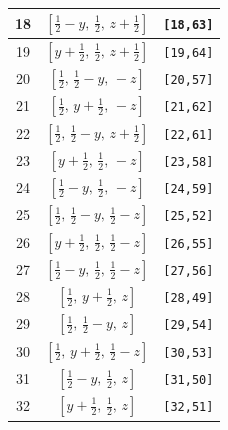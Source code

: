\documentclass[fleqn,8pt]{jsarticle}
\begin{document}
\begin{longtable}{ccc}
18 & $\left[ \frac{1}{2} - y,\, \frac{1}{2},\, z + \frac{1}{2} \right]$ & {\tt [18,63]} \\ \hline
19 & $\left[ y + \frac{1}{2},\, \frac{1}{2},\, z + \frac{1}{2} \right]$ & {\tt [19,64]} \\ \hline
20 & $\left[ \frac{1}{2},\, \frac{1}{2} - y,\, - z \right]$ & {\tt [20,57]} \\ \hline
21 & $\left[ \frac{1}{2},\, y + \frac{1}{2},\, - z \right]$ & {\tt [21,62]} \\ \hline
22 & $\left[ \frac{1}{2},\, \frac{1}{2} - y,\, z + \frac{1}{2} \right]$ & {\tt [22,61]} \\ \hline
23 & $\left[ y + \frac{1}{2},\, \frac{1}{2},\, - z \right]$ & {\tt [23,58]} \\ \hline
24 & $\left[ \frac{1}{2} - y,\, \frac{1}{2},\, - z \right]$ & {\tt [24,59]} \\ \hline
25 & $\left[ \frac{1}{2},\, \frac{1}{2} - y,\, \frac{1}{2} - z \right]$ & {\tt [25,52]} \\ \hline
26 & $\left[ y + \frac{1}{2},\, \frac{1}{2},\, \frac{1}{2} - z \right]$ & {\tt [26,55]} \\ \hline
27 & $\left[ \frac{1}{2} - y,\, \frac{1}{2},\, \frac{1}{2} - z \right]$ & {\tt [27,56]} \\ \hline
28 & $\left[ \frac{1}{2},\, y + \frac{1}{2},\, z \right]$ & {\tt [28,49]} \\ \hline
29 & $\left[ \frac{1}{2},\, \frac{1}{2} - y,\, z \right]$ & {\tt [29,54]} \\ \hline
30 & $\left[ \frac{1}{2},\, y + \frac{1}{2},\, \frac{1}{2} - z \right]$ & {\tt [30,53]} \\ \hline
31 & $\left[ \frac{1}{2} - y,\, \frac{1}{2},\, z \right]$ & {\tt [31,50]} \\ \hline
32 & $\left[ y + \frac{1}{2},\, \frac{1}{2},\, z \right]$ & {\tt [32,51]} \\
\end{longtable}
\renewcommand{\arraystretch}{1.2}
\end{document}
